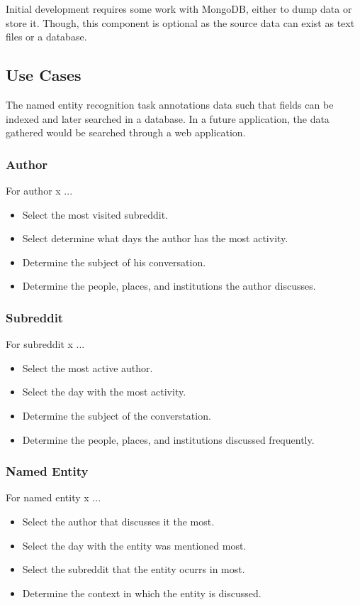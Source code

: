 \documentclass[12pt,a4paper]{article}
\begin{document}
Initial development requires some work with MongoDB, either to
dump data or store it. Though, this component is optional
as the source data can exist as text files or a database.

\subsection{Use Cases}

The named entity recognition task annotations data
such that fields can be indexed and later searched in a database.
In a future application, the data gathered would be searched
through a web application.

\subsubsection{Author}

For author x ...
\begin{itemize}
	\item Select the most visited subreddit.
	\item Select determine what days the author has the most activity.
	\item Determine the subject of his conversation.
	\item Determine the people, places, and institutions the author discusses.
\end{itemize}

\subsubsection{Subreddit}

For subreddit x ...
\begin{itemize}
	\item Select the most active author.
	\item Select the day with the most activity.
	\item Determine the subject of the converstation.
	\item Determine the people, places, and institutions discussed frequently.
\end{itemize}

\subsubsection{Named Entity}

For named entity x ...
\begin{itemize}
	\item Select the author that discusses it the most.
	\item Select the day with the entity was mentioned most.
	\item Select the subreddit that the entity ocurrs in most.
	\item Determine the context in which the entity is discussed.
\end{itemize}
	
\end{document}
